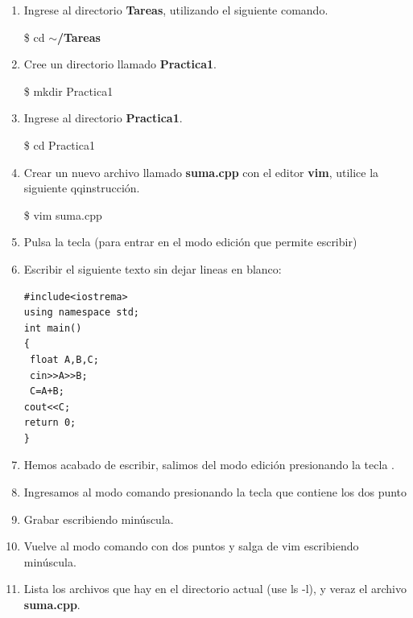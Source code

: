 \documentclass[a4paper,12pt,spanish]{article}
\begin{document}
\begin{enumerate}
  \item Ingrese al directorio \textbf{Tareas}, utilizando el siguiente comando.
    \begin{tcolorbox}[colback=gray!5]
    \$ cd \textbf{$\sim$/Tareas}
  \end{tcolorbox}

  \item  Cree un directorio llamado \textbf{Practica1}.
    \begin{tcolorbox}[colback=gray!5]
    \$ mkdir Practica1
  \end{tcolorbox}

  \item Ingrese al directorio \textbf{Practica1}.
    \begin{tcolorbox}[colback=gray!5]
    \$ cd Practica1
  \end{tcolorbox}

  \item Crear un nuevo archivo llamado \textbf{suma.cpp} con el editor \textbf{vim}, utilice  la siguiente qqinstrucción.
    \begin{tcolorbox}[colback=gray!5]
    \$ vim suma.cpp
  \end{tcolorbox}
  
  \item Pulsa la tecla  (para entrar en el modo edición que permite  escribir)
  \item Escribir el siguiente texto sin dejar lineas en blanco:
\begin{verbatim}
#include<iostrema>
using namespace std;
int main()
{
 float A,B,C;
 cin>>A>>B;
 C=A+B;
cout<<C;
return 0;
}
\end{verbatim}

  \item Hemos acabado de escribir, salimos del modo edición presionando
  la tecla .
  \item Ingresamos al modo comando presionando la tecla que contiene los dos punto
  \fbox{\Large :}
\item Grabar escribiendo  minúscula.

  
  \item Vuelve al modo comando con dos puntos \fbox{\Large :} y salga
  de vim escribiendo  minúscula.
  \item Lista los archivos que hay en el directorio actual (use ls  -l), y veraz el archivo \textbf{suma.cpp}.


\end{enumerate}
\end{document}
